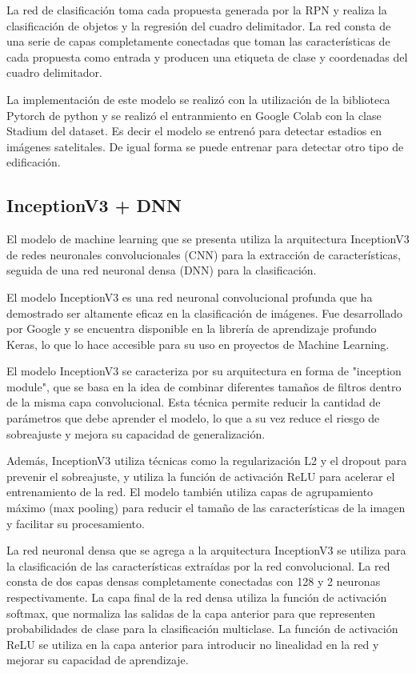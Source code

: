 \documentclass[article]{llncs}
\begin{document}
La red de clasificación toma cada propuesta generada por la RPN y realiza la clasificación de objetos y la regresión 
del cuadro delimitador. La red consta de una serie de capas completamente conectadas que toman las características de 
cada propuesta como entrada y producen una etiqueta de clase y coordenadas del cuadro delimitador.

La implementaci\'on de este modelo se realiz\'o con la utilizaci\'on de la biblioteca Pytorch de python y se realiz\'o el
entranmiento en Google Colab con la clase Stadium del dataset. Es decir el modelo se entren\'o para detectar estadios en 
im\'agenes satelitales. De igual forma se puede entrenar para detectar otro tipo de edificaci\'on.

\subsection{InceptionV3 + DNN}

El modelo de machine learning que se presenta utiliza la arquitectura InceptionV3 de redes neuronales convolucionales 
(CNN) para la extracción de características, seguida de una red neuronal densa (DNN) para la clasificación.

El modelo InceptionV3 es una red neuronal convolucional profunda que ha demostrado ser altamente eficaz en la 
clasificación de imágenes. Fue desarrollado por Google y se encuentra disponible en la librería de aprendizaje profundo 
Keras, lo que lo hace accesible para su uso en proyectos de Machine Learning.

El modelo InceptionV3 se caracteriza por su arquitectura en forma de "inception module", que se basa en la idea de 
combinar diferentes tamaños de filtros dentro de la misma capa convolucional. Esta técnica permite reducir la cantidad 
de parámetros que debe aprender el modelo, lo que a su vez reduce el riesgo de sobreajuste y mejora su capacidad de 
generalización.

Además, InceptionV3 utiliza técnicas como la regularización L2 y el dropout para prevenir el sobreajuste, y utiliza la 
función de activación ReLU para acelerar el entrenamiento de la red. El modelo también utiliza capas de agrupamiento 
máximo (max pooling) para reducir el tamaño de las características de la imagen y facilitar su procesamiento.

La red neuronal densa que se agrega a la arquitectura InceptionV3 se utiliza para la clasificación de las características 
extraídas por la red convolucional. La red consta de dos capas densas completamente conectadas con 128 y 2 neuronas respectivamente. 
La capa final de la red densa utiliza la función de activación softmax, que normaliza 
las salidas de la capa anterior para que representen probabilidades de clase para la clasificación multiclase. La función 
de activación ReLU se utiliza en la capa anterior para introducir no linealidad en la red y mejorar su capacidad de 
aprendizaje.
\end{document}
